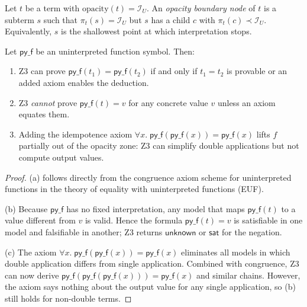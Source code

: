 \begin{definition}
\label{def:opacity-boundary}
Let $t$ be a term with $\mathrm{opacity}(t) = \mathcal{I}_U$.
An \emph{opacity boundary node} of $t$ is a subterm $s$ such that
$\pi_t(s) = \mathcal{I}_U$ but $s$ has a child $c$ with
$\pi_t(c) \prec \mathcal{I}_U$.  Equivalently, $s$ is the
shallowest point at which interpretation stops.
\end{definition}

\begin{theorem}
\label{thm:opacity-boundary}
Let $\mathsf{py\_f}$ be an uninterpreted function symbol.  Then:
\begin{enumerate}[label=(\alph*)]
  \item Z3 can prove
    $\mathsf{py\_f}(t_1) = \mathsf{py\_f}(t_2)$
    if and only if $t_1 = t_2$ is provable or an added axiom
    enables the deduction.
  \item Z3 \emph{cannot} prove $\mathsf{py\_f}(t) = v$ for any
    concrete value $v$ unless an axiom equates them.
  \item Adding the idempotence axiom
    $\forall x.\;\mathsf{py\_f}(\mathsf{py\_f}(x))
    = \mathsf{py\_f}(x)$ lifts $f$ partially out of the opacity
    zone: Z3 can simplify double applications but not compute
    output values.
\end{enumerate}
\end{theorem}

\begin{proof}
(a) follows directly from the congruence axiom scheme for
uninterpreted functions in the theory of equality with
uninterpreted functions (EUF).

(b) Because $\mathsf{py\_f}$ has no fixed interpretation, any model
that maps $\mathsf{py\_f}(t)$ to a value different from $v$ is
valid.  Hence the formula
$\mathsf{py\_f}(t) = v$ is satisfiable in one model and
falsifiable in another; Z3 returns $\mathsf{unknown}$ or
$\mathsf{sat}$ for the negation.

(c) The axiom
$\forall x.\;\mathsf{py\_f}(\mathsf{py\_f}(x)) = \mathsf{py\_f}(x)$
eliminates all models in which double application differs from
single application.  Combined with congruence, Z3 can now derive
$\mathsf{py\_f}(\mathsf{py\_f}(\mathsf{py\_f}(x))) =
\mathsf{py\_f}(x)$ and similar chains.  However, the axiom says
nothing about the output value for any single application, so (b)
still holds for non-double terms.
\end{proof}

